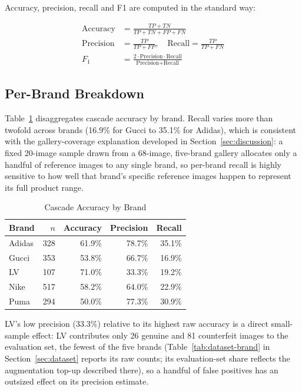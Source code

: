 \documentclass[conference]{IEEEtran}
\begin{document}
Accuracy, precision, recall and F1 are computed in the standard way:

\begin{align}
\text{Accuracy} &= \frac{TP+TN}{TP+TN+FP+FN} \\
\text{Precision} &= \frac{TP}{TP+FP}, \quad
\text{Recall} = \frac{TP}{TP+FN} \\
F_1 &= \frac{2 \cdot \text{Precision} \cdot \text{Recall}}{\text{Precision}+\text{Recall}}
\end{align}

\subsection{Per-Brand Breakdown}
\label{sec:perbrand}

Table~\ref{tab:perbrand} disaggregates cascade accuracy by brand. Recall
varies more than twofold across brands (16.9\% for Gucci to 35.1\% for
Adidas), which is consistent with the gallery-coverage explanation
developed in Section~\ref{sec:discussion}: a fixed 20-image sample drawn
from a 68-image, five-brand gallery allocates only a handful of
reference images to any single brand, so per-brand recall is highly
sensitive to how well that brand's specific reference images happen to
represent its full product range.

\begin{table}[t]
\caption{Cascade Accuracy by Brand}
\label{tab:perbrand}
\centering
\begin{tabular}{lrrrr}
\toprule
Brand & $n$ & Accuracy & Precision & Recall \\
\midrule
Adidas & 328 & 61.9\% & 78.7\% & 35.1\% \\
Gucci  & 353 & 53.8\% & 66.7\% & 16.9\% \\
LV     & 107 & 71.0\% & 33.3\% & 19.2\% \\
Nike   & 517 & 58.2\% & 64.0\% & 22.9\% \\
Puma   & 294 & 50.0\% & 77.3\% & 30.9\% \\
\bottomrule
\end{tabular}
\end{table}

LV's low precision (33.3\%) relative to its highest raw accuracy is a
direct small-sample effect: LV contributes only 26 genuine and 81
counterfeit images to the evaluation set, the fewest of the five brands
(Table~\ref{tab:dataset-brand} in Section~\ref{sec:dataset} reports its
raw counts; its evaluation-set share reflects the augmentation top-up
described there), so a handful of false positives has an outsized
effect on its precision estimate.
\end{document}
